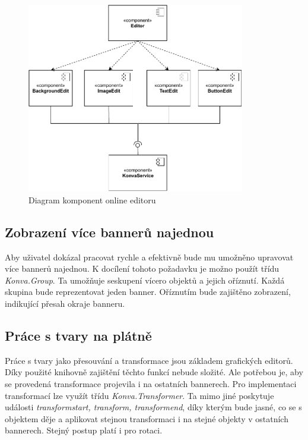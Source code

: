     \begin{figure}[h]
        \centering
        \includegraphics[width=0.85\textwidth]{Figures/component-diagram.pdf}
        \caption[Diagram komponent editoru]{Diagram komponent online editoru}
        \label{fig:component-diagram}
    \end{figure}

        \subsection{Zobrazení více bannerů najednou}
        Aby uživatel dokázal pracovat rychle a efektivně bude mu umožněno upravovat více bannerů najednou. K docílení tohoto požadavku je možno použít
        třídu \emph{Konva.Group}. Ta umožňuje seskupení vícero objektů a jejich oříznutí.
        Každá skupina bude reprezentovat jeden banner. Oříznutím bude zajištěno zobrazení, indikující přesah okraje banneru.

        \subsection{Práce s tvary na plátně}
        Práce s tvary jako přesouvání a transformace jsou základem grafických editorů. Díky použité knihovně zajištění těchto funkcí nebude složité.
        Ale potřebou je, aby se provedená transformace projevila i na ostatních bannerech. Pro implementaci transformací lze využít třídu \emph{Konva.Transformer}.
        Ta mimo jiné poskytuje události \emph{transformstart, transform, transformend}, díky kterým bude jasné, co se s objektem děje a aplikovat stejnou transformaci i
        na stejné objekty v ostatních bannerech. Stejný postup platí i pro rotaci.

